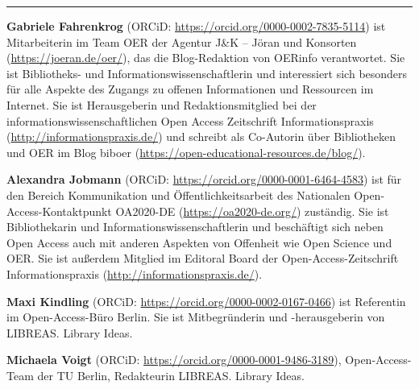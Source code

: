 \begin{center}\rule{0.5\linewidth}{0.5pt}\end{center}

\textbf{Gabriele Fahrenkrog} (ORCiD:
\url{https://orcid.org/0000-0002-7835-5114}) ist Mitarbeiterin im Team
OER der Agentur J\&K -- Jöran und Konsorten
(\url{https://joeran.de/oer/}), das die Blog-Redaktion von OERinfo
verantwortet. Sie ist Bibliotheks- und Informationswissenschaftlerin und
interessiert sich besonders für alle Aspekte des Zugangs zu offenen
Informationen und Ressourcen im Internet. Sie ist Herausgeberin und
Redaktionsmitglied bei der informationswissenschaftlichen Open Access
Zeitschrift Informationspraxis (\url{http://informationspraxis.de/}) und
schreibt als Co-Autorin über Bibliotheken und OER im Blog biboer
(\url{https://open-educational-resources.de/blog/}).

\textbf{Alexandra Jobmann} (ORCiD:
\url{https://orcid.org/0000-0001-6464-4583}) ist für den Bereich
Kommunikation und Öffentlichkeitsarbeit des Nationalen
Open-Access-Kontaktpunkt OA2020-DE (\url{https://oa2020-de.org/})
zuständig. Sie ist Bibliothekarin und Informationswissenschaftlerin und
beschäftigt sich neben Open Access auch mit anderen Aspekten von
Offenheit wie Open Science und OER. Sie ist außerdem Mitglied im
Editoral Board der Open-Access-Zeitschrift Informationspraxis
(\url{http://informationspraxis.de/}).

\textbf{Maxi Kindling} (ORCiD:
\url{https://orcid.org/0000-0002-0167-0466}) ist Referentin im
Open-Access-Büro Berlin. Sie ist Mitbegründerin und -herausgeberin von
LIBREAS. Library Ideas.

\textbf{Michaela Voigt} (ORCiD:
\url{https://orcid.org/0000-0001-9486-3189}), Open-Access-Team der TU
Berlin, Redakteurin LIBREAS. Library Ideas.

